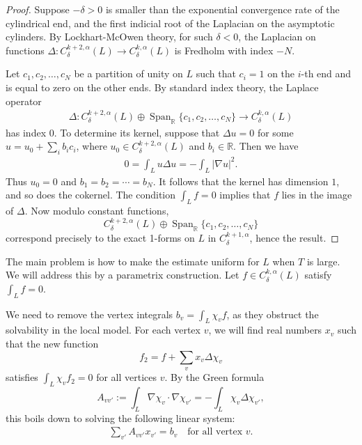 \documentclass{article}
\theoremstyle{definition}
\newcommand{\Lap}{\Delta}
\begin{document}
	\begin{proof}
		Suppose $-\delta>0$ is smaller than the exponential convergence rate of the cylindrical end, and the  first indicial root of the Laplacian on the asymptotic cylinders. By Lockhart-McOwen theory, for such $\delta < 0$, the Laplacian on functions
		$\Delta: C^{k+2,\alpha}_{\delta}(L) \to C^{k,\alpha}_{\delta}(L)$ is
		Fredholm with index $-N$. 
		
		
		
		
		Let $c_1, c_2, \ldots, c_N$ be a partition of unity on $L$ such that
		$c_i=1$ on the $i$-th end and is equal to zero on the other ends.  
		By standard index theory, the Laplace
		operator
		\begin{align*}
			\Delta:
			C^{k+2,\alpha}_{\delta}(L) \oplus \operatorname{Span}_{\mathbb{R}}\{c_1,c_2,\ldots, c_N\}
			\to
			C^{k,\alpha}_{\delta}(L)
		\end{align*}
		has index $0$. To determine its kernel, suppose that
		$ 
		\Delta u = 0
		$ 
		for some $u = u_0 + \sum_i b_i c_i$, where
		$u_0 \in C^{k+2,\alpha}_{\delta}(L)$ and $b_i \in \mathbb{R}$. Then we have
		\begin{align*}
			0 = \int_L u\Delta u  = - \int_L |\nabla u|^2.
		\end{align*}
		Thus $u_0 = 0$ and $b_1 = b_2 = \cdots = b_N$. It follows that the
		kernel has dimension $1$, and so does the cokernel. The condition
		$\int_L f = 0$ implies that $f$ lies in the image of
		$\Delta$. Now modulo constant functions,
		\[
		C^{k+2,\alpha}_{\delta}(L) \oplus \operatorname{Span}_{\mathbb{R}}\{c_1,c_2,\ldots, c_N\}  \]
		correspond precisely to the exact 1-forms on $L$ in $C^{k+1,\alpha}_\delta$, hence the result.
	\end{proof}
	
	
	
	
	The main problem is how to make the estimate uniform for $L$ when $T$ is large. We will address this by a parametrix construction. Let $f\in C^{k,\alpha}_\delta(L)$ satisfy $\int_{L} f=0$.
	
	
	
	
	We need to remove the vertex 
	integrals $b_v = \int_{L} \chi_v f$, as they obstruct the
	solvability in the local model. For each vertex
	$v$, we will find real numbers $x_v$ such that the new function
	\begin{equation}
		f_2 = f + \sum_{v} x_{v}\Delta\chi_{v} 
	\end{equation}
	satisfies
	$
	\int_{L} \chi_v f_2 = 0
	$
	for all vertices $v$. By the Green formula
	\[
	A_{vv'} := \int_{L} \nabla \chi_{v} \cdot \nabla \chi_{v'}= -\int_{L} \chi_v \Lap \chi_{v'} ,
	\]
	this boils down to solving the following linear system:
	\begin{align*}
		\sum_{v'} A_{vv'}x_{v'} = b_v \:\:\: \text{ for all vertex } v.
	\end{align*}
	
\end{document}
